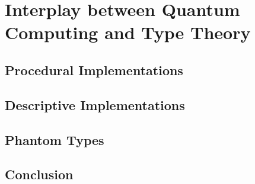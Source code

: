 \chapter{Interplay between Quantum Computing and Type Theory }

\section{Procedural Implementations}
\section{Descriptive Implementations}


\section{Phantom Types}
\section{Conclusion}
